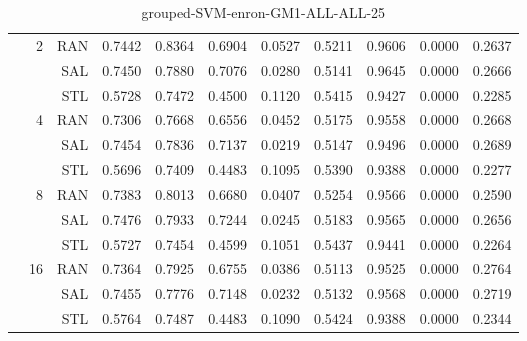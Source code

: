 \begin{center}
\begin{table}[htbp]
\begin{center}
\begin{tabular}{ | r | r | r | r | r | r | r | r | r | r | r |}
 & \multirow{3}{*}{2} & RAN & 0.7442 & 0.8364 & 0.6904 & 0.0527 & 0.5211 & 0.9606 & 0.0000 & 0.2637\\ \cline{3-11}
 &   & SAL & 0.7450 & 0.7880 & 0.7076 & 0.0280 & 0.5141 & 0.9645 & 0.0000 & 0.2666\\ \cline{3-11}
 &   & STL & 0.5728 & 0.7472 & 0.4500 & 0.1120 & 0.5415 & 0.9427 & 0.0000 & 0.2285\\ \cline{2-11}
 & \multirow{3}{*}{4} & RAN & 0.7306 & 0.7668 & 0.6556 & 0.0452 & 0.5175 & 0.9558 & 0.0000 & 0.2668\\ \cline{3-11}
 &   & SAL & 0.7454 & 0.7836 & 0.7137 & 0.0219 & 0.5147 & 0.9496 & 0.0000 & 0.2689\\ \cline{3-11}
 &   & STL & 0.5696 & 0.7409 & 0.4483 & 0.1095 & 0.5390 & 0.9388 & 0.0000 & 0.2277\\ \cline{2-11}
 & \multirow{3}{*}{8} & RAN & 0.7383 & 0.8013 & 0.6680 & 0.0407 & 0.5254 & 0.9566 & 0.0000 & 0.2590\\ \cline{3-11}
 &   & SAL & 0.7476 & 0.7933 & 0.7244 & 0.0245 & 0.5183 & 0.9565 & 0.0000 & 0.2656\\ \cline{3-11}
 &   & STL & 0.5727 & 0.7454 & 0.4599 & 0.1051 & 0.5437 & 0.9441 & 0.0000 & 0.2264\\ \cline{2-11}
 & \multirow{3}{*}{16} & RAN & 0.7364 & 0.7925 & 0.6755 & 0.0386 & 0.5113 & 0.9525 & 0.0000 & 0.2764\\ \cline{3-11}
 &   & SAL & 0.7455 & 0.7776 & 0.7148 & 0.0232 & 0.5132 & 0.9568 & 0.0000 & 0.2719\\ \cline{3-11}
 &   & STL & 0.5764 & 0.7487 & 0.4483 & 0.1090 & 0.5424 & 0.9388 & 0.0000 & 0.2344\\ \cline{2-11}
\hline
\end{tabular}
\caption{grouped-SVM-enron-GM1-ALL-ALL-25}
\end{center}
 \end{table}
\end{center}

